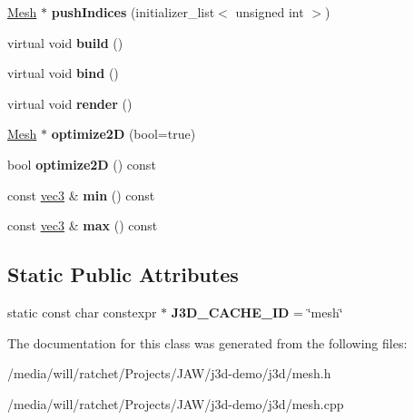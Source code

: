 \begin{DoxyCompactItemize}
\item 
\hypertarget{classj3d_1_1Mesh_a2effb08bcef93493ef5f1dd585ae2f95}{}\hyperlink{classj3d_1_1Mesh}{Mesh} $\ast$ {\bfseries push\+Indices} (initializer\+\_\+list$<$ unsigned int $>$)\label{classj3d_1_1Mesh_a2effb08bcef93493ef5f1dd585ae2f95}

\item 
\hypertarget{classj3d_1_1Mesh_a20bb2c2c6e241e5cf278af3fd8b3059b}{}virtual void {\bfseries build} ()\label{classj3d_1_1Mesh_a20bb2c2c6e241e5cf278af3fd8b3059b}

\item 
\hypertarget{classj3d_1_1Mesh_a5237bc1186c7ecaa1af79738e3d7db50}{}virtual void {\bfseries bind} ()\label{classj3d_1_1Mesh_a5237bc1186c7ecaa1af79738e3d7db50}

\item 
\hypertarget{classj3d_1_1Mesh_aa196429f3e87ecd53e8770ba979222f4}{}virtual void {\bfseries render} ()\label{classj3d_1_1Mesh_aa196429f3e87ecd53e8770ba979222f4}

\item 
\hypertarget{classj3d_1_1Mesh_a1becd0d472967c2d7797bdb17a8e2bed}{}\hyperlink{classj3d_1_1Mesh}{Mesh} $\ast$ {\bfseries optimize2\+D} (bool=true)\label{classj3d_1_1Mesh_a1becd0d472967c2d7797bdb17a8e2bed}

\item 
\hypertarget{classj3d_1_1Mesh_a95c05b5ad0db2262fa1bee52e486045b}{}bool {\bfseries optimize2\+D} () const \label{classj3d_1_1Mesh_a95c05b5ad0db2262fa1bee52e486045b}

\item 
\hypertarget{classj3d_1_1Mesh_a295a8de2d8af946c4cbca8f8636faa2b}{}const \hyperlink{structj3d_1_1vec3}{vec3} \& {\bfseries min} () const \label{classj3d_1_1Mesh_a295a8de2d8af946c4cbca8f8636faa2b}

\item 
\hypertarget{classj3d_1_1Mesh_ac4e88a913a5865dc2019cd4a5d25bcd0}{}const \hyperlink{structj3d_1_1vec3}{vec3} \& {\bfseries max} () const \label{classj3d_1_1Mesh_ac4e88a913a5865dc2019cd4a5d25bcd0}

\end{DoxyCompactItemize}
\subsection*{Static Public Attributes}
\begin{DoxyCompactItemize}
\item 
\hypertarget{classj3d_1_1Mesh_a5ae57c2edc8bb9609fd720d6fe8eb7de}{}static const char constexpr $\ast$ {\bfseries J3\+D\+\_\+\+C\+A\+C\+H\+E\+\_\+\+I\+D} = \char`\"{}mesh\char`\"{}\label{classj3d_1_1Mesh_a5ae57c2edc8bb9609fd720d6fe8eb7de}

\end{DoxyCompactItemize}


The documentation for this class was generated from the following files\+:\begin{DoxyCompactItemize}
\item 
/media/will/ratchet/\+Projects/\+J\+A\+W/j3d-\/demo/j3d/mesh.\+h\item 
/media/will/ratchet/\+Projects/\+J\+A\+W/j3d-\/demo/j3d/mesh.\+cpp\end{DoxyCompactItemize}
